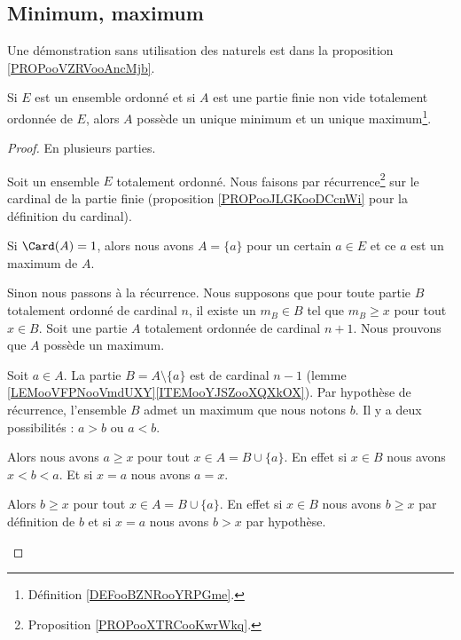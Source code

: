 \subsection{Minimum, maximum}


Une démonstration sans utilisation des naturels est dans la proposition \ref{PROPooVZRVooAncMjb}.
\begin{lemma}       \label{LEMooPCRFooXRGrUr}
	Si \( E\) est un ensemble ordonné et si \( A\) est une partie finie non vide totalement ordonnée de \( E\), alors \( A\) possède un unique minimum et un unique maximum\footnote{Définition \ref{DEFooBZNRooYRPGme}.}.
\end{lemma}

\begin{proof}
	En plusieurs parties.
	\begin{subproof}
		Soit un ensemble \( E\) totalement ordonné. Nous faisons par récurrence\footnote{Proposition \ref{PROPooXTRCooKwrWkq}.} sur le cardinal de la partie finie (proposition \ref{PROPooJLGKooDCcnWi} pour la définition du cardinal).

		Si \( \Card(A)=1\), alors nous avons \( A=\{ a \}\) pour un certain \( a\in E\) et ce \( a\) est un maximum de \( A\).

		Sinon nous passons à la récurrence. Nous supposons que pour toute partie \( B\) totalement ordonné de cardinal \( n\), il existe un \( m_B\in B\) tel que \( m_B\geq x\) pour tout \( x\in B\). Soit une partie \( A\) totalement ordonnée de cardinal \( n+1\). Nous prouvons que \( A\) possède un maximum.

		Soit \( a\in A\). La partie \( B=A\setminus\{ a \}\) est de cardinal \( n-1\) (lemme \ref{LEMooVFPNooVmdUXY}\ref{ITEMooYJSZooXQXkOX}). Par hypothèse de récurrence, l'ensemble \( B\) admet un maximum que nous notons \( b\). Il y a deux possibilités : \( a>b\) ou \( a<b\).

		\begin{subproof}
			\spitem[Si \( a>b\)]
			Alors nous avons \( a\geq x\) pour tout \( x\in A=B\cup\{ a \}\). En effet si \( x\in B\) nous avons \( x<b<a\). Et si \( x=a\) nous avons \( a=x\).

			\spitem[Si \( b>a\)]
			Alors \( b\geq x\) pour tout \( x\in A=B\cup\{ a \}\). En effet si \( x\in B\) nous avons \( b\geq x\) par définition de \( b\) et si \( x=a\) nous avons \( b>x\) par hypothèse.
		\end{subproof}


\end{subproof}
\end{proof}
